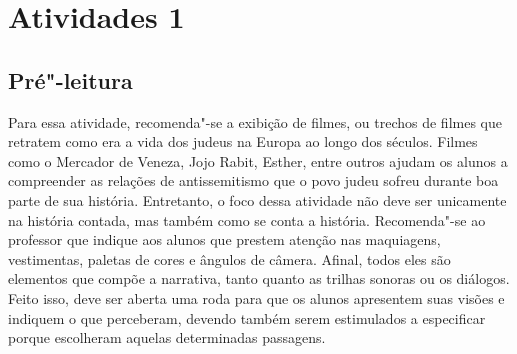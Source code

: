 \documentclass[12pt]{extarticle}
\begin{document}
\section{Atividades 1}


\subsection{Pré"-leitura}



Para essa atividade, recomenda"-se a exibição de filmes, ou
trechos de filmes que retratem como era a vida dos judeus na Europa ao
longo dos séculos. Filmes como o Mercador de Veneza, Jojo Rabit, Esther,
entre outros ajudam os alunos a compreender as relações de
antissemitismo que o povo judeu sofreu durante boa parte de sua
história. Entretanto, o foco dessa atividade não deve ser unicamente na
história contada, mas também como se conta a história. Recomenda"-se ao
professor que indique aos alunos que prestem atenção nas maquiagens,
vestimentas, paletas de cores e ângulos de câmera. Afinal, todos eles
são elementos que compõe a narrativa, tanto quanto as trilhas sonoras ou
os diálogos. Feito isso, deve ser aberta uma roda para que os alunos
apresentem suas visões e indiquem o que perceberam, devendo também serem
estimulados a especificar porque escolheram aquelas determinadas
passagens.
\end{document}
